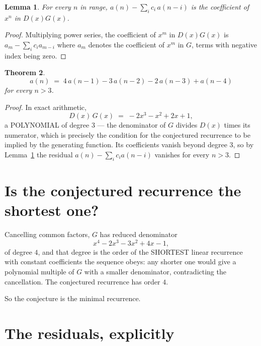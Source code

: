 \documentclass[11pt,a4paper]{article}
\theoremstyle{plain}
\newtheorem{theorem}{Theorem}
\newtheorem{lemma}[theorem]{Lemma}
\theoremstyle{definition}
\begin{document}
\begin{lemma}\label{lem:key}
For every $n$ in range, $a(n)-\sum_i c_i\,a(n-i)$ is the coefficient of $x^{n}$ in
$D(x)G(x)$.
\end{lemma}

\begin{proof}
Multiplying power series, the coefficient of $x^{m}$ in $D(x)G(x)$ is
$a_m-\sum_i c_i a_{m-i}$ where $a_m$ denotes the coefficient of $x^{m}$ in $G$, terms with
negative index being zero.
\end{proof}

\begin{theorem}
\[
a(n)\;=\;4\,a(n-1) - 3\,a(n-2) - 2\,a(n-3) + a(n-4)
\]
for every $n>3$.
\end{theorem}

\begin{proof}
In exact arithmetic,
\[
D(x)\,G(x)\;=\;- 2 x^{3} - x^{2} + 2 x + 1,
\]
a POLYNOMIAL of degree $3$ --- the denominator of $G$ divides $D(x)$ times its numerator,
which is precisely the condition for the conjectured recurrence to be implied by the
generating function. Its coefficients vanish beyond degree $3$, so by
Lemma~\ref{lem:key} the residual $a(n)-\sum_ic_ia(n-i)$ vanishes for every
$n>3$.
\end{proof}

\section{Is the conjectured recurrence the shortest one?}

Cancelling common factors, $G$ has reduced denominator
\[
x^{4} - 2 x^{3} - 3 x^{2} + 4 x - 1,
\]
of degree $4$, and that degree is the order of the SHORTEST linear recurrence with
constant coefficients the sequence obeys: any shorter one would give a polynomial multiple of
$G$ with a smaller denominator, contradicting the cancellation. The conjectured recurrence has
order $4$.

So the conjecture is the minimal recurrence.

\section{The residuals, explicitly}
\end{document}
